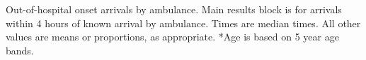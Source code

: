 \begin{frame}
\tiny
Out-of-hospital onset arrivals by ambulance. Main results block is for arrivals within 4 hours of known arrival by ambulance. Times are median times. All other values are means or proportions, as appropriate. *Age is based on 5 year age bands.

\end{frame}